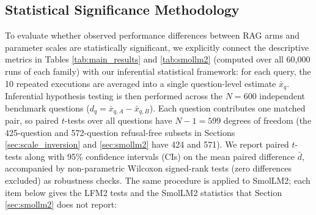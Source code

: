 \documentclass[10pt]{article}
\begin{document}
\subsection{Statistical Significance Methodology}
To evaluate whether observed performance differences between RAG arms and parameter scales are statistically significant, we explicitly connect the descriptive metrics in Tables \ref{tab:main_results} and \ref{tab:smollm2} (computed over all 60,000 runs of each family) with our inferential statistical framework: for each query, the 10 repeated executions are averaged into a single question-level estimate $\bar{x}_q$. Inferential hypothesis testing is then performed across the $N=600$ independent benchmark questions ($d_q = \bar{x}_{q,A} - \bar{x}_{q,B}$). Each question contributes one matched pair, so paired $t$-tests over all questions have $N-1=599$ degrees of freedom (the 425-question and 572-question refusal-free subsets in Sections \ref{sec:scale_inversion} and \ref{sec:smollm2} have 424 and 571). We report paired $t$-tests along with 95\% confidence intervals (CIs) on the mean paired difference $\bar{d}$, accompanied by non-parametric Wilcoxon signed-rank tests (zero differences excluded) as robustness checks. The same procedure is applied to SmolLM2; each item below gives the LFM2 tests and the SmolLM2 statistics that Section \ref{sec:smollm2} does not report:
\end{document}

